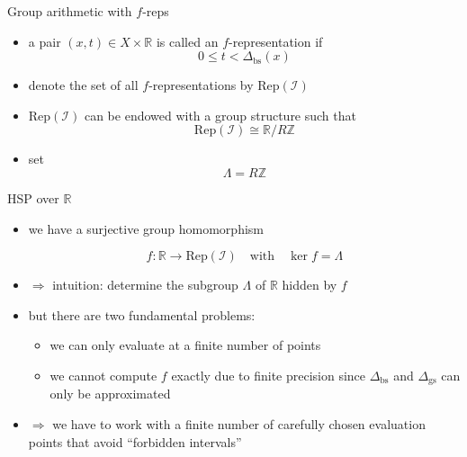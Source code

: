 \documentclass[slideColor]{prosper}
\renewcommand{\R}{\mathbb{R}}
\newcommand{\Z}{\mathbb{Z}}
\renewcommand{\>}{\rangle}
\newcommand{\<}{\langle}
\begin{document}

\begin{slide}{Group arithmetic with $f$-reps}

\begin{itemize}
\item a pair $(x,t)\in X\times \R$ is called an $f$-representation if 
\[
0 \le t < \Delta_{\mathrm{bs}}(x)
\]

\medskip
\item denote the set of all $f$-representations by $\mathrm{Rep}(\mathcal{I})$

\medskip
\item $\mathrm{Rep}(\mathcal{I})$ can be endowed with a group structure such that 
\[
\mathrm{Rep}(\mathcal{I}) \cong \R/R\Z
\]

\medskip
\item set
\[
\Lambda = R \mathbb{Z}
\]
\end{itemize}
\end{slide}


\begin{slide}{HSP over $\R$}

\begin{itemize}
\item we have a surjective group homomorphism

\[
f : \R \rightarrow \mathrm{Rep}(\mathcal{I}) \quad \mbox{with}\quad
\ker f = \Lambda
\]

\medskip
\item $\Rightarrow$ intuition: determine the subgroup $\Lambda$ of $\R$ 
hidden by $f$

\medskip
\item but there are two fundamental problems:

\medskip
\begin{itemize}
\item we can only evaluate at a finite number of points

\medskip
\item we cannot compute $f$ exactly due to finite precision since $\Delta_{\mathrm{bs}}$ and $\Delta_{\mathrm{gs}}$
can only be approximated
\end{itemize}

\item $\Rightarrow$ we have to work with a finite number of carefully chosen evaluation points that avoid ``forbidden intervals''
\end{itemize}

\end{slide}
\end{document}

